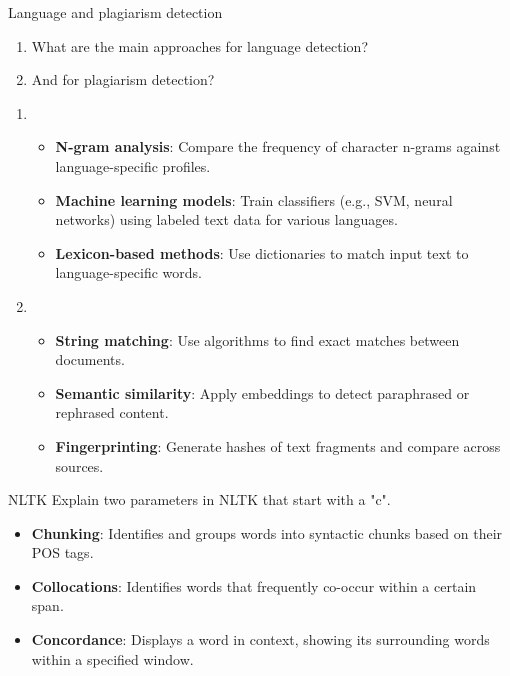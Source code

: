 \documentclass{article}
\begin{document}
\begin{exercise}{Language and plagiarism detection}\label{ex:detect}
  \begin{enumerate}
    \item What are the main approaches for language detection?
    \item And for plagiarism detection?
  \end{enumerate}

  \begin{solution}
    \begin{enumerate}
      \item \begin{itemize}
          \item \textbf{N-gram analysis}: Compare the frequency of character n-grams against language-specific profiles.
          \item \textbf{Machine learning models}: Train classifiers (e.g., SVM, neural networks) using labeled text data for various languages.
          \item \textbf{Lexicon-based methods}: Use dictionaries to match input text to language-specific words.
        \end{itemize}
      \item \begin{itemize}
          \item \textbf{String matching}: Use algorithms to find exact matches between documents.
          \item \textbf{Semantic similarity}: Apply embeddings to detect paraphrased or rephrased content.
          \item \textbf{Fingerprinting}: Generate hashes of text fragments and compare across sources.
        \end{itemize}
      \end{enumerate}
  \end{solution}
\end{exercise}

\begin{exercise}{NLTK}
  Explain two parameters in NLTK that start with a "c".

  \begin{solution}
    \begin{itemize}
      \item \textbf{Chunking}: Identifies and groups words into syntactic chunks based on their POS tags.
      \item \textbf{Collocations}: Identifies words that frequently co-occur within a certain span.
      \item \textbf{Concordance}: Displays a word in context, showing its surrounding words within a specified window.
    \end{itemize}
  \end{solution}
\end{exercise}
\end{document}
